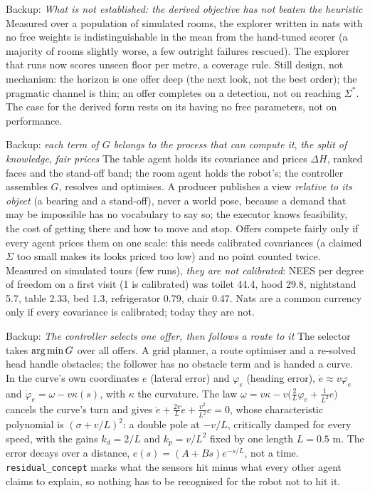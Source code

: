 \documentclass[11pt]{article}
\begin{document}
\begin{backupbox}{Backup: \emph{What is not established: the derived objective has not beaten the heuristic}}
Measured over a population of simulated rooms, the explorer written in nats with no free weights is indistinguishable in the mean from the hand-tuned scorer (a majority of rooms slightly worse, a few outright failures rescued). The explorer that runs now scores unseen floor per metre, a coverage rule. Still design, not mechanism: the horizon is one offer deep (the next look, not the best order); the pragmatic channel is thin; an offer completes on a detection, not on reaching $\Sigma^\ast$. The case for the derived form rests on its having no free parameters, not on performance.
\end{backupbox}

\begin{backupbox}{Backup: \emph{each term of $G$ belongs to the process that can compute it}, \emph{the split of knowledge}, \emph{fair prices}}
The table agent holds its covariance and prices $\Delta H$, ranked faces and the stand-off band; the room agent holds the robot's; the controller assembles $G$, resolves and optimises. A producer publishes a view \emph{relative to its object} (a bearing and a stand-off), never a world pose, because a demand that may be impossible has no vocabulary to say so; the executor knows feasibility, the cost of getting there and how to move and stop. Offers compete fairly only if every agent prices them on one scale: this needs calibrated covariances (a claimed $\Sigma$ too small makes its looks priced too low) and no point counted twice. Measured on simulated tours (few runs), \emph{they are not calibrated}: NEES per degree of freedom on a first visit (1 is calibrated) was toilet 44.4, hood 29.8, nightstand 5.7, table 2.33, bed 1.3, refrigerator 0.79, chair 0.47. Nats are a common currency only if every covariance is calibrated; today they are not.
\end{backupbox}

\begin{backupbox}{Backup: \emph{The controller selects one offer, then follows a route to it}}
The selector takes $\operatorname*{arg\,min} G$ over all offers. A grid planner, a route optimiser and a re-solved head handle obstacles; the follower has no obstacle term and is handed a curve. In the curve's own coordinates $e$ (lateral error) and $\varphi_e$ (heading error), $\dot e\approx v\varphi_e$ and $\dot\varphi_e=\omega-v\kappa(s)$, with $\kappa$ the curvature. The law $\omega=v\kappa-v\big(\tfrac2L\varphi_e+\tfrac1{L^2}e\big)$ cancels the curve's turn and gives $\ddot e+\tfrac{2v}{L}\dot e+\tfrac{v^2}{L^2}e=0$, whose characteristic polynomial is $(\sigma+v/L)^2$: a double pole at $-v/L$, critically damped for every speed, with the gains $k_d=2/L$ and $k_p=v/L^2$ fixed by one length $L=0.5$ m. The error decays over a distance, $e(s)=(A+Bs)e^{-s/L}$, not a time. \texttt{residual\_concept} marks what the sensors hit minus what every other agent claims to explain, so nothing has to be recognised for the robot not to hit it.
\end{backupbox}
\end{document}
